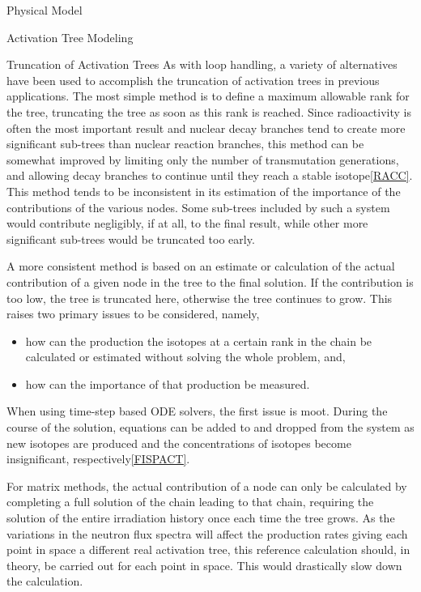 \begin{chapter}{Physical Model\label{chap:physical}}
\begin{section}{Activation Tree Modeling\label{sec:physical.chains}}
\begin{subsection}{Truncation of Activation Trees}
    As with loop handling, a variety of alternatives have been used to
    accomplish the truncation of activation trees in previous
    applications.  The most simple method is to define a maximum
    allowable rank for the tree, truncating the tree as soon as this
    rank is reached.  Since radioactivity is often the most important
    result and nuclear decay branches tend to create more significant
    sub-trees than nuclear reaction branches, this method can be
    somewhat improved by limiting only the number of transmutation
    generations, and allowing decay branches to continue until they
    reach a stable isotope\ref{RACC}.  This method tends to be
    inconsistent in its estimation of the importance of the
    contributions of the various nodes.  Some sub-trees included by
    such a system would contribute negligibly, if at all, to the final
    result, while other more significant sub-trees would be truncated
    too early.
    
    A more consistent method is based on an estimate or calculation of
    the actual contribution of a given node in the tree to the final
    solution.  If the contribution is too low, the tree is truncated
    here, otherwise the tree continues to grow.  This raises two
    primary issues to be considered, namely,
    \begin{itemize}
    \item how can the production the isotopes at a certain rank in the
      chain be calculated or estimated without solving the whole
      problem, and,
    \item how can the importance of that production be measured.
    \end{itemize}
    
    When using time-step based ODE solvers, the first issue is moot.
    During the course of the solution, equations can be added to and
    dropped from the system as new isotopes are produced and the
    concentrations of isotopes become insignificant,
    respectively\ref{FISPACT}.
    
    For matrix methods, the actual contribution of a node can only be
    calculated by completing a full solution of the chain leading to
    that chain, requiring the solution of the entire irradiation
    history once each time the tree grows.  As the variations in the
    neutron flux spectra will affect the production rates giving each
    point in space a different real activation tree, this reference
    calculation should, in theory, be carried out for each point in
    space.  This would drastically slow down the calculation.
    

\end{subsection}
\end{section}
\end{chapter}
